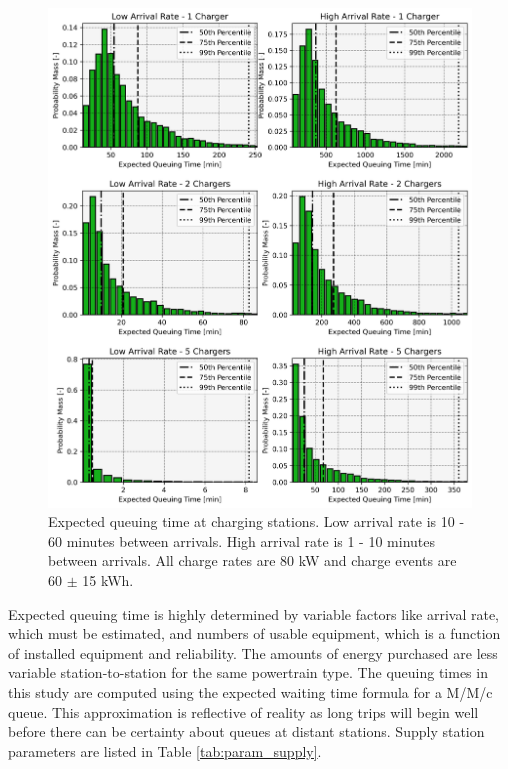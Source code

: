 \documentclass[11pt]{article}
\begin{document}
\begin{multicols}{2}
\begin{figure}[H]
	\centering
	\includegraphics[width = \linewidth]{figs/expected_delay.png}
	\caption{Expected queuing time at charging stations. Low arrival rate is 10 - 60 minutes between arrivals. High arrival rate is 1 - 10 minutes between arrivals. All charge rates are 80 kW and charge events are 60 $\pm$ 15 kWh.}
	\label{fig:expected_delay}
\end{figure}

Expected queuing time is highly determined by variable factors like arrival rate, which must be estimated, and numbers of usable equipment, which is a function of installed equipment and reliability. The amounts of energy purchased are less variable station-to-station for the same powertrain type. The queuing times in this study are computed using the expected waiting time formula for a M/M/c queue. This approximation is reflective of reality as long trips will begin well before there can be certainty about queues at distant stations. Supply station parameters are listed in Table \ref{tab:param_supply}.


\end{multicols}
\end{document}
